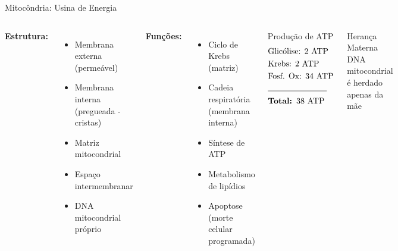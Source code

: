 \begin{frame}[allowframebreaks]{Mitocôndria: Usina de Energia}
\begin{columns}
\textbf{Estrutura:}
\begin{itemize}
    \item Membrana externa (permeável)
    \item Membrana interna (pregueada - cristas)
    \item Matriz mitocondrial
    \item Espaço intermembranar
    \item DNA mitocondrial próprio
\end{itemize}

\vspace{0.3cm}

\textbf{Funções:}
\begin{itemize}
    \item Ciclo de Krebs (matriz)
    \item Cadeia respiratória (membrana interna)
    \item Síntese de ATP
    \item Metabolismo de lipídios
    \item Apoptose (morte celular programada)
\end{itemize}

\begin{alertblock}{Produção de ATP}
\begin{equation*}
\begin{split}
&\text{Glicólise: } 2 \text{ ATP}\\
&\text{Krebs: } 2 \text{ ATP}\\
&\text{Fosf. Ox: } 34 \text{ ATP}\\
&\rule{2.5cm}{0.4pt}\\
&\textbf{Total: } 38 \text{ ATP}
\end{split}
\end{equation*}
\end{alertblock}

\begin{exampleblock}{Herança Materna}
DNA mitocondrial é herdado apenas da mãe
\end{exampleblock}
\end{columns}
\end{frame}

